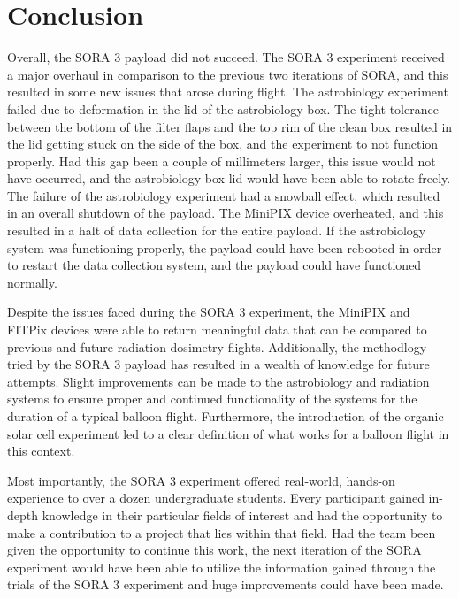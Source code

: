 \section{Conclusion}
\label{sec:Conclusion}

Overall, the SORA 3 payload did not succeed.
The SORA 3 experiment received a major overhaul in comparison to the previous two iterations of SORA, and this resulted in some new issues that arose during flight.
The astrobiology experiment failed due to deformation in the lid of the astrobiology box.
The tight tolerance between the bottom of the filter flaps and the top rim of the clean box resulted in the lid getting stuck on the side of the box, and the experiment to not function properly.
Had this gap been a couple of millimeters larger, this issue would not have occurred, and the astrobiology box lid would have been able to rotate freely.
The failure of the astrobiology experiment had a snowball effect, which resulted in an overall shutdown of the payload.
The MiniPIX device overheated, and this resulted in a halt of data collection for the entire payload.
If the astrobiology system was functioning properly, the payload could have been rebooted in order to restart the data collection system, and the payload could have functioned normally.

Despite the issues faced during the SORA 3 experiment, the MiniPIX and FITPix devices were able to return meaningful data that can be compared to previous and future radiation dosimetry flights.
Additionally, the methodlogy tried by the SORA 3 payload has resulted in a wealth of knowledge for future attempts.
Slight improvements can be made to the astrobiology and radiation systems to ensure proper and continued functionality of the systems for the duration of a typical balloon flight.
Furthermore, the introduction of the organic solar cell experiment led to a clear definition of what works for a balloon flight in this context.

Most importantly, the SORA 3 experiment offered real-world, hands-on experience to over a dozen undergraduate students.
Every participant gained in-depth knowledge in their particular fields of interest and had the opportunity to make a contribution to a project that lies within that field.
Had the team been given the opportunity to continue this work, the next iteration of the SORA experiment would have been able to utilize the information gained through the trials of the SORA 3 experiment and huge improvements could have been made.


